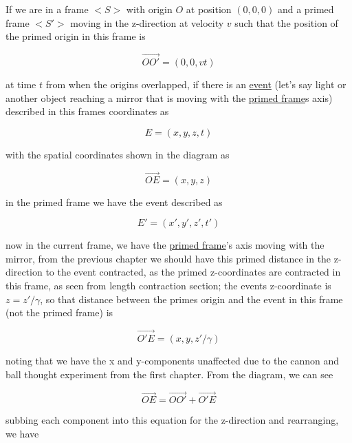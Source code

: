 If we are in a frame $<S>$ with origin $O$ at position $(0,0,0)$ and a primed frame $<S'>$ moving in the z-direction at velocity $v$ such that the position of the primed origin in this frame is

\begin{equation}
	\overrightarrow{OO'}=(0,0,vt)
\end{equation}

at time $t$ from when the origins overlapped, if there is an \hyperlink{def-event}{event} (let's say light or another object reaching a mirror that is moving with the \hyperlink{def-Primed-Frame}{primed frame}s axis) described in this frames coordinates as

\begin{equation}
	E = (x,y,z,t)
\end{equation}

with the spatial coordinates shown in the diagram as

\begin{equation}
	\overrightarrow{OE}=(x,y,z)
\end{equation}

in the primed frame we have the event described as

\begin{equation}
	E' = (x',y',z',t')
\end{equation}

now in the current frame, we have the \hyperlink{def-Primed-Frame}{primed frame}'s axis moving with the mirror, from the previous chapter we should have this primed distance in the z-direction to the event contracted, as the primed z-coordinates are contracted in this frame, as seen from length contraction section; the events z-coordinate is $z=z'/\gamma$, so that distance between the primes origin and the event in this frame (not the primed frame) is

\begin{equation}
	\overrightarrow{O'E} = (x,y,z'/\gamma)
\end{equation}

noting that we have the x and y-components unaffected due to the cannon and ball thought experiment from the first chapter. From the diagram, we can see

\begin{equation}
	\overrightarrow{OE}= \overrightarrow{OO'} + \overrightarrow{O'E}
	\label{eq: event}
\end{equation}

subbing each component into this equation for the z-direction and rearranging, we have

